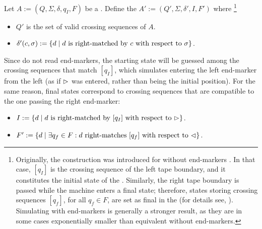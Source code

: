 Let $A:=(Q,\Sigma,\delta,q_I,F)$ be a \TDFA.
Define the \NFA $A':=(Q',\Sigma,\delta',I,F')$ where%
\footnote{ %
	Originally, the construction was introduced for \TDFAs without end-markers \cite{RabSco59}.
	In that case, $[q_I]$ is the crossing sequence of the left tape boundary, and it constitutes the initial state of the \NFA.
	Similarly, the right tape boundary is passed while the machine enters a final state; therefore, states storing crossing sequences $[q_f]$, for all $q_f\in F$, are set as final in the \NFA (for details see, \eg[,] \cite{HopUll79}).
	Simulating \TDFAs with end-markers is generally a stronger result, as they are in some cases exponentially smaller than equivalent \TDFAs without end-markers.
}
\begin{itemize}
	\item $Q'$ is the set of valid crossing sequences of $A$.
	\item $\delta'(c,\sigma):=\{d \mid \text{$d$ is right-matched by $c$ with respect to~$\sigma$}\}$.
\end{itemize}
Since \NFAs do not read end-markers, the starting state will be guessed among the crossing sequences that match $[q_I]$, which simulates entering the left end-marker from the left (as if $\rhd$ was entered, rather than being the initial position).
For the same reason, final states correspond to crossing sequences that are compatible to the one passing the right end-marker:
\begin{itemize}
	\item $I:=\{d\mid \text{$d$ is right-matched by $[q_I]$ with respect to $\rhd$}\}$.
	\item $F':=\{d\mid \exists q_f\in F: \text{$d$ right-matches $[q_f]$ with respect to $\lhd$}\}$.
\end{itemize}

